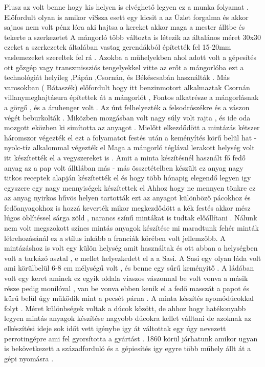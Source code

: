 \documentclass[fontsize=12pt, appendixprefix=true]{scrreprt}
\begin{document}
 Plusz  az volt benne hogy kis helyen is elvéghető legyen ez a munka folyamat  .
 Előfordult olyan is amikor viSsza esett egy kicsit a az Üzlet forgalma  és akkor sajnos nem volt pénz lóra aki hajtsa a kereket akkor maga a mester álltbe és tekerte a szerkezetet
 A mángorló több változta is létezik az általános méret 30x30  ezeket a szerkezetek általában vastag gerendákból építették fel 15-20mm vaslemezeket szereltek fel rá .
 Azokba a műhelyekben ahol adott volt a gépesítés ott gőzgép vagy transzmissziós tengelyekkel vitte az erőt a mángorlóba ezt a technológiát helyileg ,Pápán ,Csornán, és  Békéscsabán használták .
  Más varosokban ( Bátaszék) előfordult  hogy itt benzinmotort  alkalmaztak Csornán villanymeghajtásura építettek át a mángorlót ,
 Fontos alkatrésze a mángorlásnak a görgő , és a áruhenger volt .
 Az únt felhelyezték a felsodrószékre  és a vászon végét beburkolták .
 Miközben mozgásban volt nagy súly volt rajta , és ide oda mozgott  eközben ki simította az anyagot .
 Mielőtt elkezdődött a mintázás kétszer háromszor végezték el ezt a folyamatot festés után a keményítés körű belül hat - nyolc-tíz alkalommal végezték el 
 Maga a mángorló téglával lerakott helység volt itt készítették el a vegyszereket is .
 Amit a minta készítésnél használt fő fedő anyag az a pap volt álltlában más - más összetételben készült ez anyag nagy titkos receptek alapján készítették el 
 és hogy több hónapig elegendő legyen igy egyszere egy nagy mennyiségek készítettek el 
 Ahhoz hogy ne mennyen tönkre ez az anyag nyirkos hűvös helyen tartották 
 ezt az anyagot különböző  pácokhoz és fedőanyagokhoz is hozzá keverték mikor megkezdődött a kék festés akkor mész lúgos öblítéssel sárga zöld , narancs színű mintákat is tudtak előállítani .
 Nálunk nem volt megszokott színes mintás anyagok készítése mi maradtunk fehér minták létrehozásánál ez a stílus inkább a franciák körében volt  jellemzőbb.
 A mintázáshoz is volt egy külön helység amit használtak és ott abban a helységben volt a tarkázó asztal , e mellet helyezkedett  el a a Sasi.
 A Sasi egy olyan láda volt ami körülbelül 6-8 cm mélységű volt , és benne  egy sűrű keményitő .
 A ládában volt egy keret aminek ez egyik oldala viaszos vászonnal be volt vonva  a másik  része pedig monílóval , van be vonva ebben kenik el a fedő masszát a papot  és kürű belül úgy működik mint a pecsét párna .
 A minta készítés nyomódúcokkal folyt .
  Méret különbségek voltak a  dúcok között, de ahhoz hogy hatékonyabb legyen  mintás anyagok készítése nagyobb dúcokra kellet válltani de azoknak az elkészítési ideje sok időt vett  igénybe igy át váltottak egy  úgy nevezett perrotingépre ami fel gyorsította a gyártást .
 1860 körül járhatunk amikor  ugyan is bekövetkezett a századforduló és a gépiesítés igy egyre több műhely állt át  a gépi nyomásra .
\end{document}
